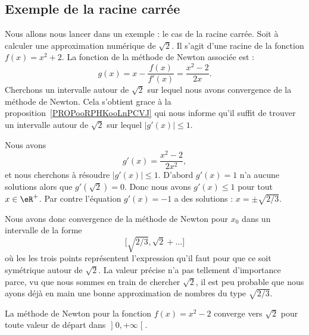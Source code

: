 \subsection{Exemple de la racine carrée}

Nous allons nous lancer dans un exemple : le cas de la racine carrée. Soit à calculer une approximation numérique de \( \sqrt{ 2 }\). Il s'agit d'une racine de la fonction \( f(x)=x^2+2\). La fonction de la méthode de Newton associée est :
\begin{equation}
	g(x)=x-\frac{ f(x) }{ f'(x) }=\frac{ x^2-2 }{ 2x }.
\end{equation}
Cherchons un intervalle autour de \( \sqrt{ 2 }\) sur lequel nous avons convergence de la méthode de Newton. Cela s'obtient grace à la proposition~\ref{PROPooRPHKooLnPCVJ} qui nous informe qu'il suffit de trouver un intervalle autour de \( \sqrt{ 2 }\) sur lequel \( | g'(x) |\leq 1\).

Nous avons
\begin{equation}
	g'(x)=\frac{ x^2-2 }{ 2x^2 },
\end{equation}
et nous cherchons à résoudre \( | g'(x) |\leq 1\). D'abord \( g'(x)=1\) n'a aucune solutions alors que \( g'(\sqrt{ 2 })=0\). Donc nous avons \(  g'(x) \leq 1\) pour tout \( x\in \eR^+\). Par contre l'équation \( g'(x)=-1\) a des solutions : \( x=\pm\sqrt{ 2/3 }\).

Nous avons donc convergence de la méthode de Newton pour \( x_0\) dans un intervalle de la forme
\begin{equation}
	\mathopen[ \sqrt{ 2/3 } , \sqrt{ 2 }+\ldots \mathclose]
\end{equation}
où les les trois points représentent l'expression qu'il faut pour que ce soit symétrique autour de \( \sqrt{ 2 }\). La valeur précise n'a pas tellement d'importance parce, vu que nous sommes en train de chercher \( \sqrt{ 2 }\), il est peu probable que nous ayons déjà en main une bonne approximation de nombres du type \( \sqrt{ 2/3 }\).

\begin{proposition}
	La méthode de Newton pour la fonction \( f(x)=x^2-2\) converge vers \( \sqrt{ 2 }\) pour toute valeur de départ dans \( \mathopen] 0 , +\infty \mathclose[\).
\end{proposition}

